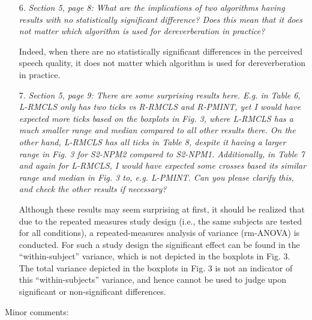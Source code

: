 \documentclass[10pt, a4paper]{article}
\begin{document}
\begin{itemize}
\item[6.] {\textit{Section 5, page 8: What are the implications of two algorithms having results with no statistically significant difference? Does this mean that it does not matter which algorithm is used for dereverberation in practice?}}

Indeed, when there are no statistically significant differences in the perceived speech quality, it does not matter which algorithm is used for dereverberation in practice.

\item[7.] {\textit{Section 5, page 9: There are some surprising results here. E.g. in Table 6, L-RMCLS only has two ticks vs R-RMCLS and R-PMINT, yet I would have expected more ticks based on the boxplots in Fig. 3, where L-RMCLS has a much smaller range and median compared to all other results there. On the other hand, L-RMCLS has all ticks in Table 8, despite it having a larger range in Fig. 3 for S2-NPM2 compared to S2-NPM1. Additionally, in Table 7 and again for L-RMCLS, I would have expected some crosses based its similar range and median in Fig. 3 to, e.g. L-PMINT. Can you please clarify this, and check the other results if necessary?}}


Although these results may seem surprising at first, it should be realized that due to the repeated measures study design (i.e., the same subjects are tested for all conditions), a repeated-measures analysis of variance (rm-ANOVA) is conducted. For such a study design the significant effect can be found in the ``within-subject'' variance, which is not depicted in the boxplots in Fig. 3.
The total variance depicted in the boxplots in Fig. 3 is not an indicator of this ``within-subjects'' variance, and hence cannot be used to judge upon significant or non-significant differences.

\end{itemize}

{\large{Minor comments:}}
\end{document}
